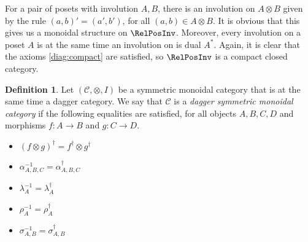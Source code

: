 \documentclass{article}
\theoremstyle{definition}
\newtheorem{definition}[theorem]{Definition}
\newcommand{\C}{\mathcal{C}}
\begin{document}
For a pair of posets with involution $A,B$, there is an involution
on $A\otimes B$ given by the rule $(a,b)'=(a',b')$, for all $(a,b)\in A\otimes B$.
It is obvious that this gives us a monoidal structure on $\RelPosInv$.
Moreover, every involution on a poset $A$ is at the same time an involution on is
dual $A^*$. Again, it is clear that the axioms \eqref{diag:compact} are satisfied,
so $\RelPosInv$ is a compact closed category.

\begin{definition}
\label{def:dagsymmonoidal}
Let $(\C,\otimes,I)$ be a symmetric monoidal category that is at the same time
a dagger category. We say that $\C$ is a {\em dagger symmetric monoidal category}
if the following equalities are satisfied, for all objects $A,B,C,D$ and
morphisms $f\colon A\to B$ and $g\colon C\to D$.
\begin{itemize}
\item $(f\otimes g)^\dag=f^\dag\otimes g^\dag$
\item $\alpha_{A,B,C}^{-1}=\alpha_{A,B,C}^\dag$
\item $\lambda_A^{-1}=\lambda_A^\dag$
\item $\rho_A^{-1}=\rho_A^\dag$
\item $\sigma_{A,B}^{-1}=\sigma_{A,B}^\dag$
\end{itemize}
\end{definition}
\end{document}
